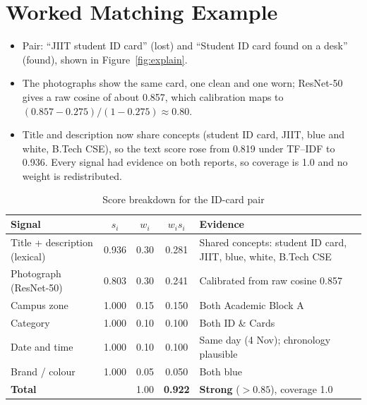 \documentclass[12pt,a4paper,oneside]{report}
\begin{document}
\section{Worked Matching Example}\label{sec:worked}
\begin{itemize}
  \item Pair: ``JIIT student ID card'' (lost) and ``Student ID card found on a desk'' (found), shown in Figure~\ref{fig:explain}.
  \item The photographs show the same card, one clean and one worn; ResNet-50 gives a raw cosine of about 0.857, which calibration maps to $(0.857-0.275)/(1-0.275) \approx 0.80$.
  \item Title and description now share concepts (student ID card, JIIT, blue and white, B.Tech CSE), so the text score rose from 0.819 under TF--IDF to 0.936. Every signal had evidence on both reports, so coverage is 1.0 and no weight is redistributed.
\end{itemize}
\begin{table}[H]
\centering\small
\caption[Score breakdown for the ID-card pair]{Score breakdown for the ID-card pair}
\label{tab:worked}
\begin{tabularx}{\textwidth}{lccc X}
\toprule
Signal & $s_i$ & $w_i$ & $w_i s_i$ & Evidence\\
\midrule
Title + description (lexical) & 0.936 & 0.30 & 0.281 & Shared concepts: student ID card, JIIT, blue, white, B.Tech CSE\\
Photograph (ResNet-50) & 0.803 & 0.30 & 0.241 & Calibrated from raw cosine 0.857\\
Campus zone & 1.000 & 0.15 & 0.150 & Both Academic Block A\\
Category & 1.000 & 0.10 & 0.100 & Both ID \& Cards\\
Date and time & 1.000 & 0.10 & 0.100 & Same day (4 Nov); chronology plausible\\
Brand / colour & 1.000 & 0.05 & 0.050 & Both blue\\
\midrule
\textbf{Total} & & 1.00 & \textbf{0.922} & \textbf{Strong} ($>0.85$), coverage 1.0\\
\bottomrule
\end{tabularx}
\end{table}
\end{document}
